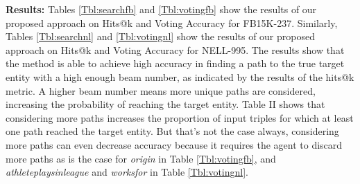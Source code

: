 \noindent \textbf{Results: } %
Tables \ref{Tbl:searchfb} and \ref{Tbl:votingfb} show the results of our proposed approach on Hits@k and Voting Accuracy for FB15K-237. Similarly, Tables \ref{Tbl:searchnl} and \ref{Tbl:votingnl} show the results of our proposed approach on Hits@k and Voting Accuracy for NELL-995.
The results show that the method is able to achieve high accuracy in finding a path to the true target entity with a high enough beam number, as indicated by the results of the hits@k metric. A higher beam number means more unique paths are considered, increasing the probability of reaching the target entity. Table II shows that considering more paths increases the proportion of input triples for which at least one path reached the target entity. But that's not the case always, considering more paths can even decrease accuracy because it requires the agent to discard more paths as is the case for \textit{origin} in Table \ref{Tbl:votingfb}, and \textit{athleteplaysinleague} and \textit{worksfor} in Table \ref{Tbl:votingnl}. %
